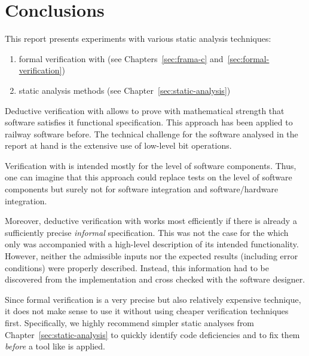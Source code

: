 
\chapter{Conclusions}
\label{sec:conclusions}

This report presents experiments with various static analysis techniques:

\begin{enumerate}
\item formal verification with \framacwp (see Chapters~\ref{sec:frama-c}
      and~\ref{sec:formal-verification})
\item static analysis methods (see Chapter~\ref{sec:static-analysis})
\end{enumerate}


Deductive verification with \framacwp allows to prove with mathematical strength
that software satisfies it functional specification.
This approach has been applied to railway software before\cite{INDIN2103-FOKUS}.
The technical challenge for the software analysed in the report at hand is
the extensive use of low-level bit operations.

Verification with \framacwp is intended mostly for the level of software components.
Thus, one can imagine that this approach could replace tests on the 
level of software components but surely not for software integration
and software\slash hardware integration.

Moreover, deductive verification with \framacwp works most efficiently
if there is already a sufficiently precise \emph{informal} specification.
This was not the case for the \bitwalker which only was accompanied with
a high-level description of its intended functionality.
However, neither the admissible inputs nor the expected results (including error conditions)
were properly described.
Instead, this information had to be discovered from the implementation and cross checked
with the software designer.

Since formal verification is a very precise but also relatively expensive technique,
it does not make sense to use it without using cheaper verification techniques first.
Specifically, we highly recommend  simpler static analyses from 
Chapter~\ref{sec:static-analysis} to quickly identify code deficiencies
and to fix them \emph{before} a tool like \framacwp is applied.


